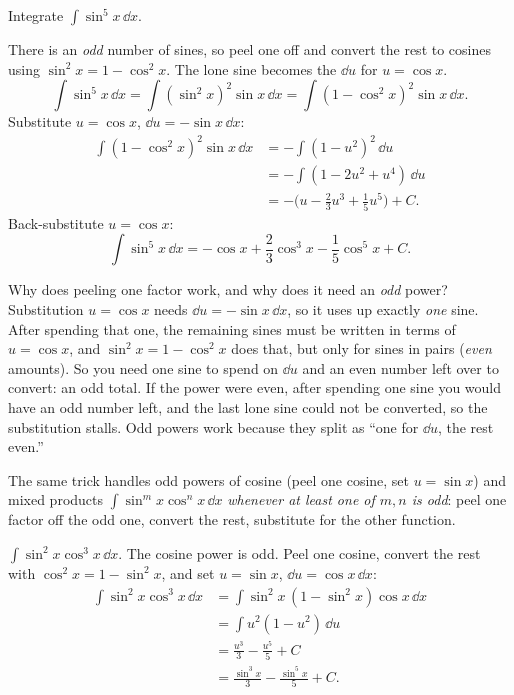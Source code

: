 \begin{example}
\label{ch24:ex-odd}
Integrate $\displaystyle \int \sin^5 x\,\dd x.$
\end{example}

There is an \emph{odd} number of sines, so peel one off
and convert the rest to cosines using $\sin^2 x = 1 - \cos^2 x$. The lone sine
becomes the $\dd u$ for $u = \cos x$.
\[
\int \sin^5 x\,\dd x
= \int (\sin^2 x)^2 \sin x\,\dd x
= \int (1 - \cos^2 x)^2 \sin x\,\dd x.
\]
Substitute $u = \cos x$, $\dd u = -\sin x\,\dd x$:
\begin{align*}
\int (1 - \cos^2 x)^2 \sin x\,\dd x
&= -\int (1 - u^2)^2\,\dd u\\
&= -\int (1 - 2u^2 + u^4)\,\dd u\\
&= -\Big(u - \tfrac{2}{3}u^3 + \tfrac{1}{5}u^5\Big) + C.
\end{align*}
Back-substitute $u = \cos x$:
\[
\int \sin^5 x\,\dd x = -\cos x + \frac{2}{3}\cos^3 x - \frac{1}{5}\cos^5 x + C.
\]

\begin{whybox}
Why does peeling one factor work, and why does it need an \emph{odd} power?
Substitution $u=\cos x$ needs $\dd u = -\sin x\,\dd x$, so it uses up exactly
\emph{one} sine. After spending that one, the remaining sines must be
written in terms of $u=\cos x$, and $\sin^2 x = 1 - \cos^2 x$ does that, but
only for sines in pairs (\emph{even} amounts). So you need one sine to
spend on $\dd u$ and an even number left over to convert: an odd total. If the
power were even, after spending one sine you would have an odd number left, and
the last lone sine could not be converted, so the substitution stalls. Odd powers
work because they split as ``one for $\dd u$, the rest even.''
\end{whybox}

The same trick handles odd powers of cosine (peel one cosine, set $u=\sin x$)
and mixed products $\int \sin^m x\cos^n x\,\dd x$ \emph{whenever at least one
of $m,n$ is odd}: peel one factor off the odd one, convert the rest, substitute
for the other function.

\begin{example}
$\displaystyle \int \sin^2 x\cos^3 x\,\dd x.$ The cosine power is odd. Peel one
cosine, convert the rest with $\cos^2 x = 1 - \sin^2 x$, and set $u = \sin x$,
$\dd u = \cos x\,\dd x$:
\begin{align*}
\int \sin^2 x\cos^3 x\,\dd x
&= \int \sin^2 x\,(1-\sin^2 x)\cos x\,\dd x\\
&= \int u^2(1-u^2)\,\dd u\\
&= \frac{u^3}{3} - \frac{u^5}{5} + C\\
&= \frac{\sin^3 x}{3} - \frac{\sin^5 x}{5} + C.
\end{align*}
\end{example}

